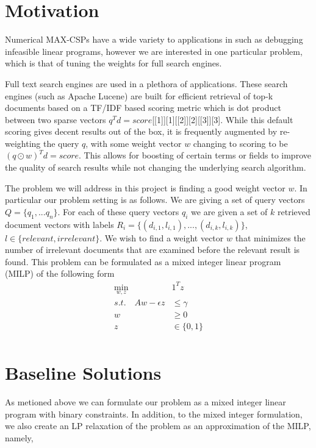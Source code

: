 \documentclass[a4paper]{article}
\begin{document}
\section{Motivation}

Numerical MAX-CSPs have a wide variety to applications in such as debugging infeasible 
linear programs, however we are interested in one particular problem, which is that of 
tuning the weights for full search engines. 

Full text search engines are used in a plethora of applications. These search engines (such as Apache Lucene)
are built for efficient retrieval of top-k documents based on a TF/IDF based scoring metric which is dot 
product between two sparse vectors $q^Td = score$[[1]][1][[2]][2][[3]][3]. While this default scoring gives decent results out of the box, 
it is frequently augmented by re-weighting the query $q$, with some weight vector $w$
changing to scoring to be $(q\odot w)^Td = score$. This allows for boosting of certain terms or fields
to improve the quality of search results while not changing the underlying search algorithm. 

The problem we will address in this project is finding a good weight vector $w$. In particular our
problem setting is as follows. We are giving a set of query vectors $Q = \{q_1, ... q_n\}$. For each 
of these query vectors $q_i$ we are given a set of $k$ retrieved document vectors with labels $R_i = \{(d_{i,1}, l_{i,1}), ..., (d_{i, k}, l_{i,k})\}$, 
$l \in \{relevant, irrelevant\}$.
We wish to find a weight vector $w$ that minimizes the number of irrelevant documents that are examined 
before the relevant result is found. This problem can be formulated as a mixed integer linear program (MILP)
of the following form
\begin{align*}
\min_{w,z}\quad &1^Tz\\
s.t. \quad Aw - \epsilon z &\leq \gamma\\
		w &\geq 0\\
		z &\in \{0,1\}\\
\end{align*}


\section{Baseline Solutions}

As metioned above we can formulate our problem as a mixed integer linear program 
with binary constraints. In addition, to the mixed integer formulation, we also create an LP
relaxation of the problem as an approximation of the MILP, namely, 
\end{document}
